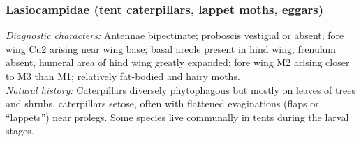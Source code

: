 \documentclass[letterpaper, 11pt]{article}
\begin{document}
\subsubsection{Lasiocampidae (tent caterpillars, lappet moths, eggars)}
\noindent{}\textit{Diagnostic characters:} Antennae bipectinate; proboscis vestigial or absent; fore wing Cu2 arising near wing base; basal areole present in hind wing; frenulum absent, humeral area of hind wing greatly expanded; fore wing M2 arising closer to M3 than M1; relatively fat-bodied and hairy moths.\\

\noindent{}\textit{Natural history:} Caterpillars diversely phytophagous but mostly on leaves of trees and shrubs. caterpillars setose, often with flattened evaginations (flaps or ``lappets'') near prolegs. Some species live communally in tents during the larval stages.
\end{document}
